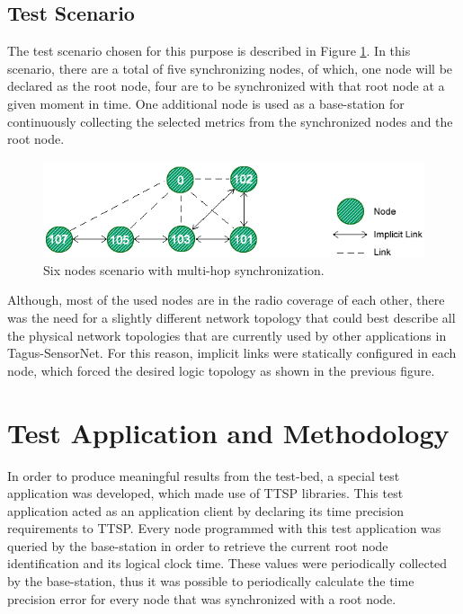 \subsection{Test Scenario}
The test scenario chosen for this purpose is described in Figure \ref{scenario6}. In this scenario, there are a total of five synchronizing nodes, of which, one node will be declared as the root node, four are to be synchronized with that root node at a given moment in time. One additional node is used as a base-station for continuously collecting the selected metrics from the synchronized nodes and the root node. 

\begin{figure}[!htb]
\begin{center}
\includegraphics[scale=0.4]{./images/19-ttsp-test_topology.png}
\end{center}
\caption{Six nodes scenario with multi-hop synchronization.}
\label{scenario6}
\end{figure}

Although, most of the used nodes are in the radio coverage of each other, there was the need for a slightly different network topology that could best describe all the physical network topologies that are currently used by other applications in Tagus-SensorNet. For this reason, implicit links were statically configured in each node, which forced the desired logic topology as shown in the previous figure.

\section{Test Application and Methodology}
In order to produce meaningful results from the test-bed, a special test application was developed, which made use of TTSP libraries. This test application acted as an application client by declaring its time precision requirements to TTSP. Every node programmed with this test application was queried by the base-station in order to retrieve the current root node identification and its logical clock time. These values were periodically collected by the base-station, thus it was possible to periodically calculate the time precision error for every node that was synchronized with a root node.

